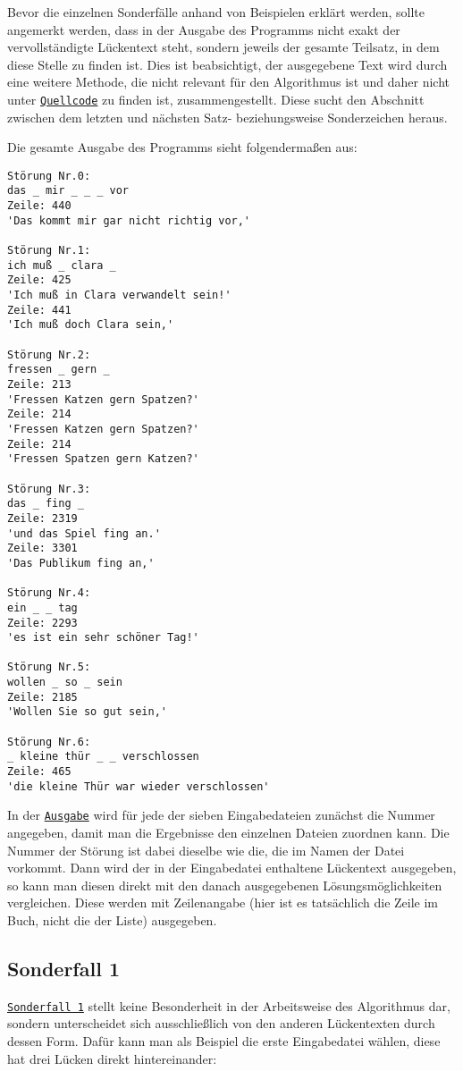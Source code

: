 \documentclass[a4paper, 10pt, ngerman]{scrartcl}
\begin{document}
Bevor die einzelnen Sonderfälle anhand von Beispielen erklärt werden,
sollte angemerkt werden,
dass in der Ausgabe des Programms nicht exakt der vervollständigte Lückentext steht,
sondern jeweils der gesamte Teilsatz,
in dem diese Stelle zu finden ist.
Dies ist beabsichtigt,
der ausgegebene Text wird durch eine weitere Methode,
die nicht relevant für den Algorithmus ist
und daher nicht unter \hyperref[sec:quellcode]{\texttt{Quellcode}} zu finden ist,
zusammengestellt.
Diese sucht den Abschnitt zwischen dem letzten und nächsten Satz- beziehungsweise Sonderzeichen heraus.

\clearpage

Die gesamte Ausgabe des Programms sieht folgendermaßen aus:

\begin{lstlisting}[title=Ausgabe des Programms, breaklines=true, label=lst:ausgabe]
Störung Nr.0:
das _ mir _ _ _ vor 
Zeile: 440
'Das kommt mir gar nicht richtig vor,'

Störung Nr.1:
ich muß _ clara _ 
Zeile: 425
'Ich muß in Clara verwandelt sein!'
Zeile: 441
'Ich muß doch Clara sein,'

Störung Nr.2:
fressen _ gern _ 
Zeile: 213
'Fressen Katzen gern Spatzen?'
Zeile: 214
'Fressen Katzen gern Spatzen?'
Zeile: 214
'Fressen Spatzen gern Katzen?'

Störung Nr.3:
das _ fing _ 
Zeile: 2319
'und das Spiel fing an.'
Zeile: 3301
'Das Publikum fing an,'

Störung Nr.4:
ein _ _ tag 
Zeile: 2293
'es ist ein sehr schöner Tag!'

Störung Nr.5:
wollen _ so _ sein 
Zeile: 2185
'Wollen Sie so gut sein,'

Störung Nr.6:
_ kleine thür _ _ verschlossen 
Zeile: 465
'die kleine Thür war wieder verschlossen'
\end{lstlisting}

In der \hyperref[lst:ausgabe]{\texttt{Ausgabe}} wird für jede der sieben Eingabedateien zunächst die Nummer angegeben,
damit man die Ergebnisse den einzelnen Dateien zuordnen kann.
Die Nummer der Störung ist dabei dieselbe wie die,
die im Namen der Datei vorkommt.
Dann wird der in der Eingabedatei enthaltene Lückentext ausgegeben,
so kann man diesen direkt mit den danach ausgegebenen Lösungsmöglichkeiten vergleichen.
Diese werden mit Zeilenangabe
(hier ist es tatsächlich die Zeile im Buch,
nicht die der Liste) ausgegeben.

\clearpage

\subsection{Sonderfall 1}\label{sec:ersterSonderfall}
\hyperref[sonderfallEins]{\texttt{Sonderfall 1}} stellt keine Besonderheit in der Arbeitsweise des Algorithmus dar,
sondern unterscheidet sich ausschließlich von den anderen Lückentexten durch dessen Form.
Dafür kann man als Beispiel die erste Eingabedatei wählen,
diese hat drei Lücken direkt hintereinander:
\end{document}
